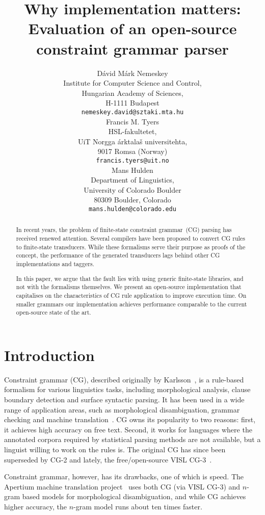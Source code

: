\documentclass[11pt]{article}
\title{Why implementation matters: Evaluation of an open-source constraint grammar parser}
\author{Dávid Márk Nemeskey \\
Institute for Computer Science and Control, \\
Hungarian Academy of Sciences, \\
H-1111 Budapest \\
{\tt nemeskey.david@sztaki.mta.hu} \\\And
Francis M. Tyers \\
HSL-fakultetet,\\
UiT Norgga árktalaš universitehta,\\
9017 Romsa (Norway) \\
{\tt francis.tyers@uit.no} \\\AND 
Mans Hulden \\
Department of Linguistics, \\
University of Colorado Boulder \\
80309 Boulder, Colorado\\
{\tt mans.hulden@colorado.edu} }
\date{}
\begin{document}
\maketitle

\begin{abstract}
  In recent years, the problem of finite-state constraint grammar~(CG) parsing
  has received renewed attention. Several compilers have been proposed to
  convert CG rules to finite-state transducers. While these formalisms serve
  their purpose as proofs of the concept, the performance of the generated
  transducers lags behind other CG implementations and taggers.
  
  In this paper, we argue that the fault lies with using generic finite-state
  libraries, and not with the formalisms themselves. We present an open-source
  implementation that capitalises on the characteristics of CG rule
  application to improve execution time. On smaller grammars our 
  implementation achieves performance
  comparable to the current open-source state of the art.
\end{abstract}



\section{Introduction}

Constraint grammar (CG), described originally by Karlsson~,
is a rule-based formalism for various linguistics tasks, including morphological
analysis, clause boundary detection and surface syntactic parsing. It has
been used in a wide range of application areas, such as morphological
disambiguation, grammar checking and machine translation~\cite{Bick:2011}. CG
owns its popularity to two reasons: first, it achieves high accuracy on free
text. Second, it works for languages where the annotated corpora required by
statistical parsing methods are not available, but a linguist willing to work on
the rules is. The original CG has since been superseded by CG-2 \cite{Tapanainen:1996} and lately, the free/open-source VISL
CG-3~\cite{Bick:2000,Didriksen:2011}.

Constraint grammar, however, has its drawbacks, one of which is speed. The
Apertium machine translation project~\cite{Apertium:2011} uses both CG (via
VISL CG-3) and $n$-gram based models for morphological disambiguation, and while
CG achieves higher accuracy, the $n$-gram model runs about ten times faster.
\end{document}
